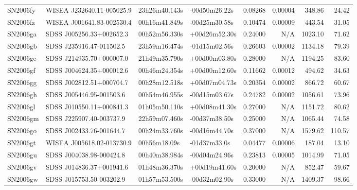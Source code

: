\begin{longtable}{llllrrrr}
SN2006fy         &       WISEA J232640.11-005025.9 &   23h26m40.143s &   -00d50m26.22s &  0.08268 &  0.00004 &   348.86 &       24.42 \\
SN2006fz         &       WISEA J001641.83-002530.4 &   00h16m41.849s &   -00d25m30.58s &  0.10474 &  0.00009 &   443.54 &       31.05 \\
SN2006ga         &        SDSS J005256.33+002652.3 &   00h52m56.330s &   +00d26m52.30s &  0.24000 &      N/A &  1023.10 &       71.62 \\
SN2006gb         &        SDSS J235916.47-011502.5 &   23h59m16.474s &   -01d15m02.56s &  0.26603 &  0.00002 &  1134.18 &       79.39 \\
SN2006ge         &        SDSS J214935.70+000007.0 &   21h49m35.790s &   +00d00m03.80s &  0.28000 &      N/A &  1194.25 &       83.60 \\
SN2006gf         &        SDSS J004624.35+000012.6 &   00h46m24.354s &   +00d00m12.60s &  0.11662 &  0.00012 &   494.62 &       34.63 \\
SN2006gg         &        SDSS J002812.51+000704.7 &   00h28m12.518s &   +00d07m04.73s &  0.20354 &  0.00002 &   866.72 &       60.67 \\
SN2006gh         &        SDSS J005446.95-001503.6 &   00h54m46.955s &   -00d15m03.67s &  0.24782 &  0.00002 &  1056.61 &       73.96 \\
SN2006gl         &        SDSS J010550.11+000841.3 &   01h05m50.110s &   +00d08m41.30s &  0.27000 &      N/A &  1151.72 &       80.62 \\
SN2006gm         &        SDSS J225907.40-003737.9 &   22h59m07.460s &   -00d37m38.50s &  0.25000 &      N/A &  1065.44 &       74.58 \\
SN2006go         &        SDSS J002433.76-001644.7 &   00h24m33.760s &   -00d16m44.70s &  0.37000 &      N/A &  1579.62 &      110.57 \\
SN2006gt         &       WISEA J005618.02-013730.9 &    00h56m18.09s &    -01d37m33.0s &  0.04477 &  0.00006 &   187.04 &       13.10 \\
SN2006gu         &        SDSS J004038.98-000424.8 &   00h40m38.984s &   -00d04m24.96s &  0.23813 &  0.00005 &  1014.99 &       71.05 \\
SN2006gv         &        SDSS J014836.37+001941.6 &   01h48m36.370s &   +00d19m41.60s &  0.20000 &      N/A &   852.47 &       59.67 \\
SN2006gw         &        SDSS J015753.50-003202.9 &   01h57m53.500s &   -00d32m02.90s &  0.33000 &      N/A &  1409.37 &       98.66 \\

\end{longtable}
